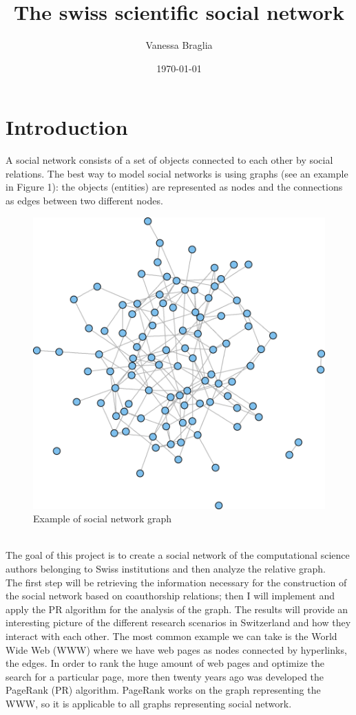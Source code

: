 \documentclass[12 pt]{article}
\author{Vanessa Braglia}
\title{The swiss scientific social network}
\date{\today}
\begin{document}
\selectfont
\maketitle 
\newpage
\tableofcontents
\newpage
\section{Introduction}
A social network consists of a set of objects connected to each other by social relations. The best way to model social networks is using graphs (see an example in Figure 1): the objects (entities) are represented as nodes and the connections as edges between two different nodes. \\
\begin{figure} [h!]
\centering 
\includegraphics[scale=0.5]{graph.png}
\caption{Example of social network graph}
\end{figure}
\\
The goal of this project is to create a social network of the computational science authors belonging to Swiss institutions and then analyze the relative graph.\\
The first step will be retrieving the information necessary for the construction of the social network based on coauthorship relations; then I will implement and apply the PR algorithm for the analysis of the graph.
The results will provide an interesting picture of the different research scenarios in Switzerland and how they interact with each other.
The most common example we can take is the World Wide Web (WWW) where we have web pages as nodes connected by hyperlinks, the edges. In order to rank the huge amount of web pages and optimize the search for a particular page, more then twenty years ago was developed the PageRank (PR) algorithm. PageRank works on the graph representing the WWW, so it is applicable to all graphs representing social network.
\end{document}
